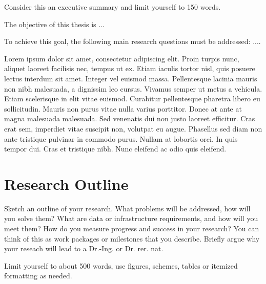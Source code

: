 \documentclass[11pt,DIV=16,parskip=half]{scrartcl}
\begin{document}
Consider this an executive summary and limit yourself to 150 words.

The objective of this thesis is ...

To achieve this goal, the following main research questions must be addressed: ....

Lorem ipsum dolor sit amet, consectetur adipiscing elit. Proin turpis nunc, aliquet laoreet facilisis nec, tempus ut ex. Etiam iaculis tortor nisl, quis posuere lectus interdum sit amet. Integer vel euismod massa. Pellentesque lacinia mauris non nibh malesuada, a dignissim leo cursus. Vivamus semper ut metus a vehicula. Etiam scelerisque in elit vitae euismod. Curabitur pellentesque pharetra libero eu sollicitudin. Mauris non purus vitae nulla varius porttitor. Donec at ante at magna malesuada malesuada. Sed venenatis dui non justo laoreet efficitur. Cras erat sem, imperdiet vitae suscipit non, volutpat eu augue. Phasellus sed diam non ante tristique pulvinar in commodo purus. Nullam at lobortis orci. In quis tempor dui. Cras et tristique nibh. Nunc eleifend ac odio quis eleifend.

\section{Research Outline}
Sketch an outline of your research.
What problems will be addressed, how will you solve them?
What are data or infrastructure requirements, and how will you meet them?
How do you measure progress and success in your research?
You can think of this as work packages or milestones that you describe.
Briefly argue why your reseach will lead to a Dr.-Ing. or Dr. rer. nat.

Limit yourself to about 500 words, use figures, schemes, tables or itemized formatting as needed.



\printbibliography
\end{document}

